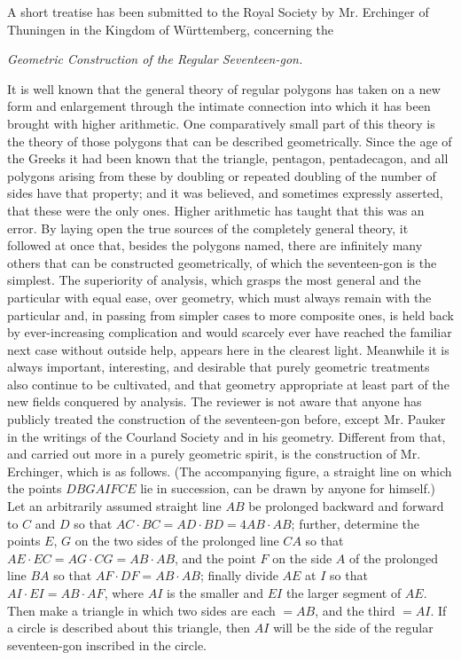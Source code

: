 \documentclass[12pt]{article}
\begin{document}
A short treatise has been submitted to the Royal Society by Mr. Erchinger of Thuningen in the Kingdom of Württemberg, concerning the
\begin{center}
\textit{Geometric Construction of the Regular Seventeen-gon.}
\end{center}
It is well known that the general theory of regular polygons has taken on a new form and enlargement through the intimate connection into which it has been brought with higher arithmetic. One comparatively small part of this theory is the theory of those polygons that can be described geometrically. Since the age of the Greeks it had been known that the triangle, pentagon, pentadecagon, and all polygons arising from these by doubling or repeated doubling of the number of sides have that property; and it was believed, and sometimes expressly asserted, that these were the only ones. Higher arithmetic has taught that this was an error. By laying open the true sources of the completely general theory, it followed at once that, besides the polygons named, there are infinitely many others that can be constructed geometrically, of which the seventeen-gon is the simplest. The superiority of analysis, which grasps the most general and the particular with equal ease, over geometry, which must always remain with the particular and, in passing from simpler cases to more composite ones, is held back by ever-increasing complication and would scarcely ever have reached the familiar next case without outside help, appears here in the clearest light. Meanwhile it is always important, interesting, and desirable that purely geometric treatments also continue to be cultivated, and that geometry appropriate at least part of the new fields conquered by analysis. The reviewer is not aware that anyone has publicly treated the construction of the seventeen-gon before, except Mr. Pauker in the writings of the Courland Society and in his geometry. Different from that, and carried out more in a purely geometric spirit, is the construction of Mr. Erchinger, which is as follows. (The accompanying figure, a straight line on which the points $D B G A I F C E$ lie in succession, can be drawn by anyone for himself.) Let an arbitrarily assumed straight line $AB$ be prolonged backward and forward to $C$ and $D$ so that $AC\cdot BC=AD\cdot BD=4AB\cdot AB$; further, determine the points $E$, $G$ on the two sides of the prolonged line $CA$ so that $AE\cdot EC=AG\cdot CG=AB\cdot AB$, and the point $F$ on the side $A$ of the prolonged line $BA$ so that $AF\cdot DF=AB\cdot AB$; finally divide $AE$ at $I$ so that $AI\cdot EI=AB\cdot AF$, where $AI$ is the smaller and $EI$ the larger segment of $AE$. Then make a triangle in which two sides are each $=AB$, and the third $=AI$. If a circle is described about this triangle, then $AI$ will be the side of the regular seventeen-gon inscribed in the circle.
\end{document}
